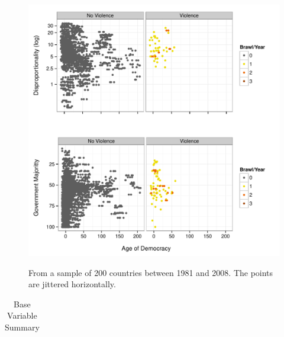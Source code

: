 \documentclass[a4paper]{article}\usepackage{graphicx, color}
\newenvironment{knitrout}{}{} %
\begin{document}
{{\begin{figure}[t]
\begin{center}
\begin{knitrout}
\color{fgcolor}\includegraphics[width=0.8\linewidth]{figure/FrameworkEmpirical} 
\end{knitrout}

    \end{center}
    \begin{singlespace}
        {\scriptsize{From a sample of 200 countries between 1981 and 2008. The points are jittered horizontally.}}
    \end{singlespace}

\end{figure}

\begin{table}[!h]
    \begin{center}
    \caption{Base Variable Summary}
    \label{var_summary}
    \begin{tabular}{l m{7cm} m{3.5cm}}


\end{tabular}
\end{center}
\end{table}}}
\end{document}
